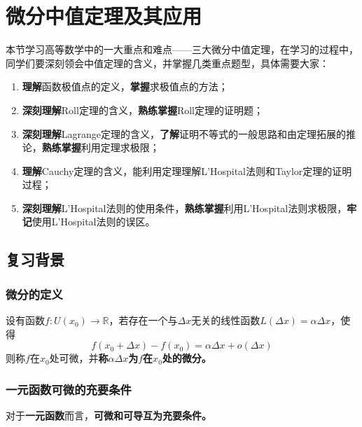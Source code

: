 \chapter{微分中值定理及其应用}\label{ch:4}

本节学习高等数学中的一大重点和难点——三大微分中值定理，在学习的过程中，同学们要深刻领会中值定理的含义，并掌握几类重点题型，具体需要大家：

\begin{enumerate}
	\item \textbf{理解}函数极值点的定义，\textbf{掌握}求极值点的方法；
	\item \textbf{深刻理解}Roll定理的含义，\textbf{熟练掌握}Roll定理的证明题；
	\item \textbf{深刻理解}Lagrange定理的含义，\textbf{了解}证明不等式的一般思路和由定理拓展的推论，\textbf{熟练掌握}利用定理求极限；
	\item \textbf{理解}Cauchy定理的含义，能利用定理理解L'Hospital法则和Taylor定理的证明过程；
	\item \textbf{深刻理解}L'Hospital法则的使用条件，\textbf{熟练掌握}利用L'Hospital法则求极限，\textbf{牢记}使用L'Hospital法则的误区。
\end{enumerate}

\section{复习背景}\label{sec:4.1}

\subsection{微分的定义}\label{sec:4.1.1}

\begin{definition}
	设有函数$f:U(x_0)\to\mathbb{R}$，若存在一个与$\Delta x$无关的线性函数$L(\Delta x)=\alpha\Delta x$，使得
	\begin{equation}
		f(x_0+\Delta x)-f(x_0)=\alpha\Delta x+o(\Delta x)
	\end{equation}
	则称$f$在$x_0$处可微，并\textbf{称$\alpha\Delta x$为$f$在$x_0$处的微分。}
\end{definition}

\subsection{一元函数可微的充要条件}\label{sec:4.1.2}

对于\textbf{一元函数}而言，\textbf{可微和可导互为充要条件。}

